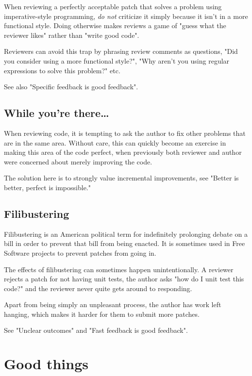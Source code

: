 \documentclass{article}
\begin{document}
When reviewing a perfectly acceptable patch that solves a problem using imperative-style programming, {\it do not} criticize it simply because it isn't in a more functional style. Doing otherwise makes reviews a game of "guess what the reviewer likes" rather than "write good code".

Reviewers can avoid this trap by phrasing review comments as questions, "Did you consider using a more functional style?", "Why aren't you using regular expressions to solve this problem?" etc.

See also "Specific feedback is good feedback".

\subsection{While you're there\ldots}

When reviewing code, it is tempting to ask the author to fix other problems that are in the same area. Without care, this can quickly become an exercise in making this area of the code perfect, when previously both reviewer and author were concerned about merely improving the code.

The solution here is to strongly value incremental improvements, see "Better is better, perfect is impossible."

\subsection{Filibustering}

Filibustering is an American political term for indefinitely prolonging debate on a bill in order to prevent that bill from being enacted. It is sometimes used in Free Software projects to prevent patches from going in.

The effects of filibustering can sometimes happen unintentionally. A reviewer rejects a patch for not having unit tests, the author asks "how do I unit test this code?" and the reviewer never quite gets around to responding.

Apart from being simply an unpleasant process, the author has work left hanging, which makes it harder for them to submit more patches.

See "Unclear outcomes" and "Fast feedback is good feedback".


\section{Good things}
\end{document}
